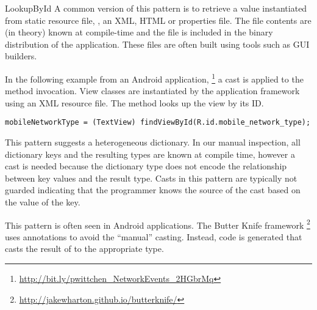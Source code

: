 \begin{pattern}{LookupById}
A common version of this pattern is to retrieve a value instantiated from
static resource file, \eg, an XML, HTML or \java{} properties file.
The file contents are (in theory) known at compile-time and the file is included in the binary distribution of the application.
These files are often built using tools such as GUI builders.

In the following example from an Android application,%
\footnote{\url{http://bit.ly/pwittchen_NetworkEvents_2HGbrMq}}
a cast is applied to the  method invocation.
View classes are instantiated by the application framework using an XML resource file.
The  method looks up the view by its ID.

\begin{verbatim}
mobileNetworkType = (TextView) findViewById(R.id.mobile_network_type);
\end{verbatim}

\discussion{}
This pattern suggests a heterogeneous dictionary.
In our manual inspection,
all dictionary keys and the resulting types are known at
compile time, however
a cast is needed because the dictionary type does not encode the
relationship between key values and the result type.
Casts in this pattern are typically not guarded indicating that the programmer
knows the source of the cast based on the value of the key.

This pattern is often seen in Android applications.
The Butter Knife framework%
\footnote{\url{http://jakewharton.github.io/butterknife/}}
uses annotations to avoid the ``manual'' casting.
Instead, code is generated that casts the result of  to the
appropriate type.









\end{pattern}
